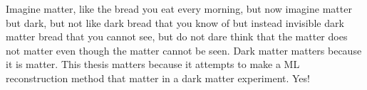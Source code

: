 \noindent
Imagine matter, like the bread you eat every morning, but now imagine matter but dark, but not like dark bread that you know of but instead invisible dark matter bread that you cannot see, but do not dare think that the matter does not matter even though the matter cannot be seen. Dark matter matters because it is matter. This thesis matters because it attempts to make a ML reconstruction method that matter in a dark matter experiment. Yes!

\lipsum[1]